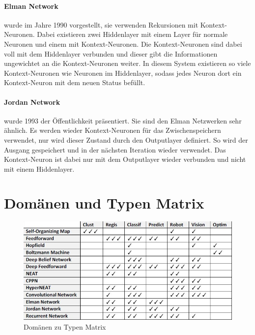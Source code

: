 \paragraph{Elman Network} wurde im Jahre 1990 vorgestellt, sie verwenden Rekursionen mit Kontext-Neuronen. 
Dabei existieren zwei Hiddenlayer mit einem Layer für normale Neuronen und einem mit Kontext-Neuronen. 
Die Kontext-Neuronen sind dabei voll mit dem Hiddenlayer verbunden und dieser gibt die Informationen ungewichtet an die Kontext-Neuronen weiter.
In diesem System existieren so viele Kontext-Neuronen wie Neuronen im Hiddenlayer, sodass jedes Neuron dort ein Kontext-Neuron mit dem neuen Status befüllt.

\paragraph{Jordan Network} wurde 1993 der Öffentlichkeit präsentiert.
Sie sind den Elman Netzwerken sehr ähnlich. 
Es werden wieder Kontext-Neuronen für das Zwischenspeichern verwendet, nur wird dieser Zustand durch den Outputlayer definiert.
So wird der Ausgang gespeichert und in der nächsten Iteration wieder verwendet.
Das Kontext-Neuron ist dabei nur mit dem Outputlayer wieder verbunden und nicht mit einem Hiddenlayer.

\section{Domänen und Typen Matrix}

\begin{figure}
	\includegraphics[scale=0.68]{images/typen_domains.png}
	\caption{Domänen zu Typen Matrix \cite{AI3}}
	\label{fig:DomainMatrix}
\end{figure}

